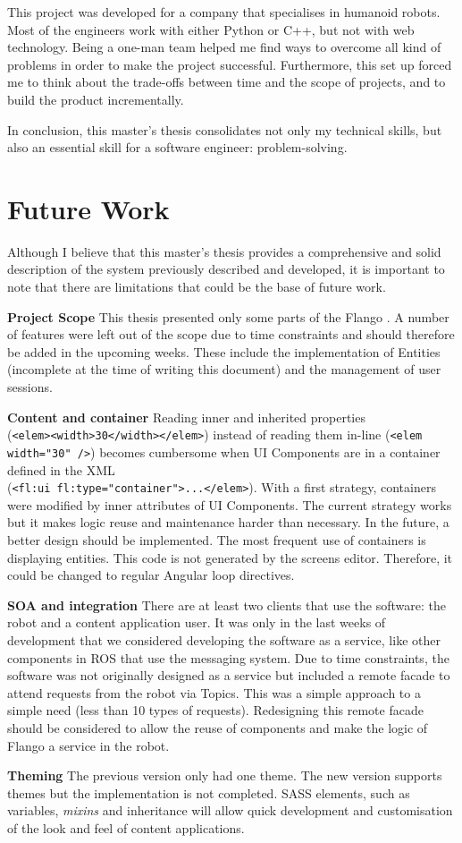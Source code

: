 This project was developed for a company that specialises in humanoid robots.
Most of the engineers work with either Python or C++, but not with web technology.
Being a one-man team helped me find ways to overcome all kind of problems in order to make the project successful.
Furthermore, this set up forced me to think about the trade-offs between time and the scope of projects, and to build the product incrementally.

In conclusion, this master's thesis consolidates not only my technical skills, but also an essential skill for a software engineer: problem-solving.


\section{Future Work}
Although I believe that this master's thesis provides a comprehensive and solid description of the system previously described and developed, it is important to note that there are limitations that could be the base of  future work.

\textbf{Project Scope} This thesis presented only some parts of the Flango \cm . 
A number of features were left out of the scope due to time constraints and should therefore be added in the upcoming weeks.
These include the implementation of Entities (incomplete at the time of writing this document) and the management of user sessions.

\textbf{Content and container} Reading inner and inherited properties \\(\lstinline$<elem><width>30</width></elem>$) instead of reading them in-line (\lstinline$<elem width="30" />$) becomes cumbersome when UI Components are in a container defined in the \ac{XML} \\ (\lstinline$<fl:ui fl:type="container">...</elem>$).
With a first strategy, containers were modified by inner attributes of UI Components.
The current strategy works but it makes logic reuse and maintenance harder than necessary.
In the future, a better design should be implemented.
The most frequent use of containers is displaying entities.
This code is not generated by the screens editor. 
Therefore, it could be changed to regular Angular loop directives.

\textbf{SOA and integration} There are at least two clients that use the software: the robot and a content application user.
It was only in the last weeks of development that we considered developing the software as a service, like other components in \ac{ROS} that use the messaging system.
Due to time constraints, the software was not originally designed as a service but included a remote facade to attend requests from the robot via Topics.
This was a simple approach to a simple need (less than 10 types of requests).
Redesigning this remote facade should be considered to allow the reuse of components and make the logic of Flango \cm a service in the robot.

\textbf{Theming} The previous version only had one theme.
The new version supports themes but the implementation is not completed.
\ac{SASS} elements, such as variables, \textit{mixins} and inheritance will allow quick development and customisation of the look and feel of content applications.

